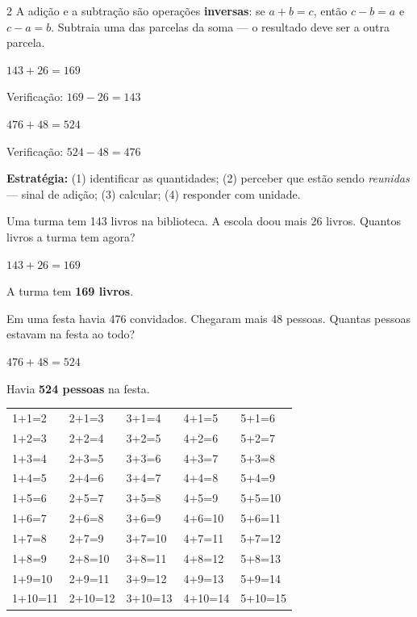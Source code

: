 \documentclass[12pt]{article}
\begin{document}
\begin{multicols}{2}
A adição e a subtração são operações \textbf{inversas}: se $a + b = c$, então $c - b = a$ e $c - a = b$. Subtraia uma das parcelas da soma — o resultado deve ser a outra parcela.

$143 + 26 = 169$

Verificação: $169 - 26 = 143$ \checkmark

\vspace{4pt}

$476 + 48 = 524$

Verificação: $524 - 48 = 476$ \checkmark


\textbf{Estratégia:} (1) identificar as quantidades; (2) perceber que estão sendo \textit{reunidas} — sinal de adição; (3) calcular; (4) responder com unidade.


Uma turma tem 143 livros na biblioteca. A escola doou mais 26 livros. Quantos livros a turma tem agora?

$143 + 26 = 169$

A turma tem \textbf{169 livros}.


Em uma festa havia 476 convidados. Chegaram mais 48 pessoas. Quantas pessoas estavam na festa ao todo?

$476 + 48 = 524$

Havia \textbf{524 pessoas} na festa.


\setlength{\tabcolsep}{10pt}
\begin{tabular}{lllll}
1+1=2  & 2+1=3  & 3+1=4  & 4+1=5  & 5+1=6  \\
1+2=3  & 2+2=4  & 3+2=5  & 4+2=6  & 5+2=7  \\
1+3=4  & 2+3=5  & 3+3=6  & 4+3=7  & 5+3=8  \\
1+4=5  & 2+4=6  & 3+4=7  & 4+4=8  & 5+4=9  \\
1+5=6  & 2+5=7  & 3+5=8  & 4+5=9  & 5+5=10 \\
1+6=7  & 2+6=8  & 3+6=9  & 4+6=10 & 5+6=11 \\
1+7=8  & 2+7=9  & 3+7=10 & 4+7=11 & 5+7=12 \\
1+8=9  & 2+8=10 & 3+8=11 & 4+8=12 & 5+8=13 \\
1+9=10 & 2+9=11 & 3+9=12 & 4+9=13 & 5+9=14 \\
1+10=11 & 2+10=12 & 3+10=13 & 4+10=14 & 5+10=15 \\
\end{tabular}


\end{multicols}
\end{document}
